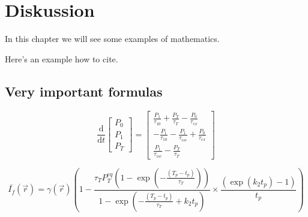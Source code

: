 \chapter*{Diskussion}

In this chapter we will see some examples of mathematics.

Here's an example how to cite.~\cite{atc13}

\lipsum[1]

\section{Very important formulas}
\lipsum[2]

\begin{equation}\label{eqn:rate_eqns}
	\frac{\textrm{d}}{\textrm{d}t}\left[
	\begin{array}{l}
		P_{\textit{0}} \\
		P_{\textit{1}} \\
		P_{\textit{T}}
	\end{array}
	\right] =
	\left[
	\begin{array}{l}
		\frac{P_{\textit{1}}}{\tau_{\textit{10}}} + \frac{P_{\textit{T}}}{\tau_{\textit{T}}} - \frac{P_{\textit{0}}}{\tau_{\textit{ex}}} \\
		- \frac{P_{\textit{1}}}{\tau_{\textit{10}}} - \frac{P_{\textit{1}}}{\tau_{isc}} + \frac{P_{\textit{0}}}{\tau_{\textit{ex}}} \\
		\frac{P_{\textit{1}}}{\tau_{isc}} -  \frac{P_{\textit{T}}}{\tau_{\textit{T}}}
	\end{array}
	\right]
\end{equation}

\lipsum[3]


\begin{equation}\label{eqn:avgfluorescence}
	\bar{I_{f}}(\vec{r})
	= \gamma(\vec{r}) \left(1 - \frac{\tau_{\textit{T}} P_{\textit{T}}^{{eq}}\left(1-\exp \left(-\frac{(T_p - t_p)}{\tau_{\textit{T}}}\right)\right)}{1-\exp\left(-\frac{(T_p - t_p)}{\tau_{\textit{T}}} + k_{\textit{2}} t_p\right)} \times \frac{\left(\exp\left(k_{\textit{2}} t_p\right)-1\right)}{t_p} \right)
\end{equation}

\lipsum[3]
